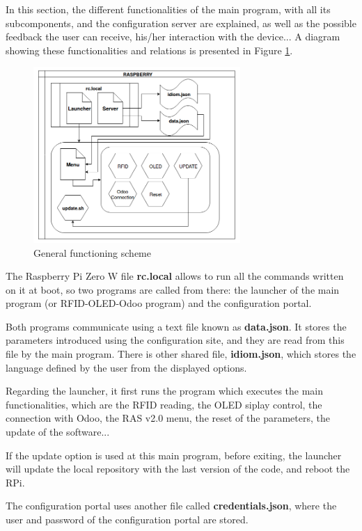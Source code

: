 \documentclass[12pt,a4paper,oneside]{article} %
\begin{document}
In this section, the different functionalities of the main program, with all its subcomponents, and the configuration server are explained, as well as the possible feedback the user can receive, his/her interaction with the device... A diagram showing these functionalities and relations is presented in Figure \ref{sch-gen}.

\begin{figure}[h]
	\centering
	\includegraphics[width=0.7\textwidth]{images/scheme_general.png}
	\caption[General functioning scheme]{General functioning scheme}
	\label{sch-gen}
\end{figure}

The Raspberry Pi Zero W file \textbf{rc.local} allows to run all the commands written on it at boot, so two programs are called from there: the launcher of the main program (or RFID-OLED-Odoo program) and the configuration portal.

Both programs communicate using a text file known as \textbf{data.json}. It stores the parameters introduced using the configuration site, and they are read from this file by the main program. There is other shared file, \textbf{idiom.json}, which stores the language defined by the user from the displayed options.

Regarding the launcher, it first runs the program which executes the main functionalities, which are the RFID reading, the OLED siplay control, the connection with Odoo, the RAS v2.0 menu, the reset of the parameters, the update of the software...

If the update option is used at this main program, before exiting, the launcher will update the local repository with the last version of the code, and reboot the RPi.

The configuration portal uses another file called \textbf{credentials.json}, where the user and password of the configuration portal are stored.
\end{document}
